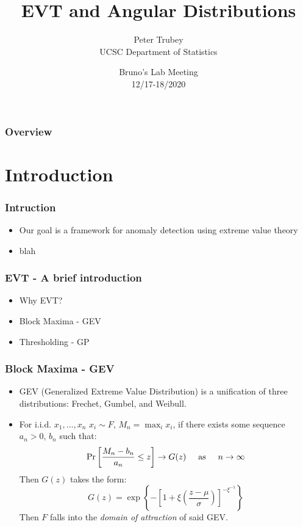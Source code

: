 \documentclass[aspectratio=169]{beamer}
\title{EVT and Angular Distributions}
\author{Peter Trubey \\ UCSC Department of Statistics}
\date[12/18/2020]{Bruno's Lab Meeting\\12/17-18/2020}
\begin{document}
\begin{frame}
  \titlepage
\end{frame}

\begin{frame}
  \frametitle{Overview}
  \tableofcontents
\end{frame}

\section{Introduction}

\begin{frame}
  \frametitle{Intruction}
  \begin{itemize}
    \item Our goal is a framework for anomaly detection using extreme value theory
    \item blah
  \end{itemize}
\end{frame}

\begin{frame}
  \frametitle{EVT - A brief introduction}
  \begin{itemize}
    \item Why EVT?
    \item Block Maxima - GEV
    \item Thresholding - GP
  \end{itemize}
\end{frame}

\begin{frame}
  \frametitle{Block Maxima - GEV}
  \begin{itemize}
    \item GEV (Generalized Extreme Value Distribution) is a unification of three distributions:
      Frechet, Gumbel, and Weibull.
    \item For i.i.d. $x_1,\ldots,x_n$ $x_i \sim F$, $M_n = \max_{i}x_i$, if there exists some
      sequence $a_n > 0$, $b_n$ such that:
      \begin{equation*}
        \text{Pr}\left[\frac{M_n - b_n}{a_n} \leq z\right]\to G(z)
          \hspace{0.5cm}\text{as}\hspace{0.5cm}n\to\infty
      \end{equation*}
      Then $G(z)$ takes the form:
      \begin{equation*}
        G(z) = \exp\left\lbrace
            -\left[1 + \xi\left(\frac{z - \mu}{\sigma}\right)\right]^{-\xi^{-1}}
            \right\rbrace
      \end{equation*}
      Then $F$ falls into the \emph{domain of attraction} of said GEV.
  \end{itemize}
\end{frame}
\end{document}
